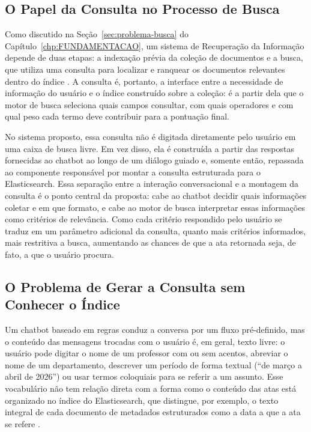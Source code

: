 \subsection{O Papel da Consulta no Processo de Busca}

Como discutido na Seção~\ref{sec:problema-busca} do Capítulo~\ref{chp:FUNDAMENTACAO}, um sistema de Recuperação da Informação depende de duas etapas: a indexação prévia da coleção de documentos e a busca, que utiliza uma consulta para localizar e ranquear os documentos relevantes dentro do índice \cite{manning2008ir}. A consulta é, portanto, a interface entre a necessidade de informação do usuário e o índice construído sobre a coleção: é a partir dela que o motor de busca seleciona quais campos consultar, com quais operadores e com qual peso cada termo deve contribuir para a pontuação final.

No sistema proposto, essa consulta não é digitada diretamente pelo usuário em uma caixa de busca livre. Em vez disso, ela é construída a partir das respostas fornecidas ao chatbot ao longo de um diálogo guiado e, somente então, repassada ao componente responsável por montar a consulta estruturada para o Elasticsearch. Essa separação entre a interação conversacional e a montagem da consulta é o ponto central da proposta: cabe ao chatbot decidir quais informações coletar e em que formato, e cabe ao motor de busca interpretar essas informações como critérios de relevância. Como cada critério respondido pelo usuário se traduz em um parâmetro adicional da consulta, quanto mais critérios informados, mais restritiva a busca, aumentando as chances de que a ata retornada seja, de fato, a que o usuário procura.

\subsection{O Problema de Gerar a Consulta sem Conhecer o Índice}\label{sec:problema-gerar-consulta}

Um chatbot baseado em regras conduz a conversa por um fluxo pré-definido, mas o conteúdo das mensagens trocadas com o usuário é, em geral, texto livre: o usuário pode digitar o nome de um professor com ou sem acentos, abreviar o nome de um departamento, descrever um período de forma textual (``de março a abril de 2026'') ou usar termos coloquiais para se referir a um assunto. Esse vocabulário não tem relação direta com a forma como o conteúdo das atas está organizado no índice do Elasticsearch, que distingue, por exemplo, o texto integral de cada documento de metadados estruturados como a data a que a ata se refere \cite{IBMElasticsearch}.

